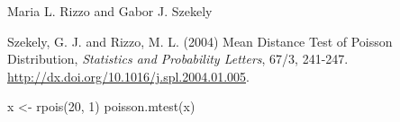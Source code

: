 \begin{Author}\relax
Maria L. Rizzo  and
Gabor J. Szekely 
\end{Author}
\begin{References}\relax
Szekely, G. J. and Rizzo, M. L. (2004) Mean Distance Test of Poisson Distribution, \emph{Statistics and Probability Letters}, 
67/3, 241-247. \url{http://dx.doi.org/10.1016/j.spl.2004.01.005}.
\end{References}
\begin{SeeAlso}\relax
{}
\end{SeeAlso}
\begin{Examples}
\begin{ExampleCode}
 x <- rpois(20, 1)
 poisson.mtest(x)
 \end{ExampleCode}
\end{Examples}

